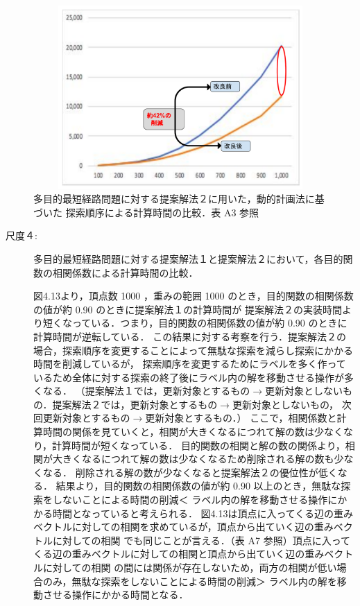 \documentclass[12pt]{optlab-bachelor}
\begin{document}
\begin{figure}[htbp]
  \centering
  \includegraphics[height=7.0cm , width=15.0cm]{fig/fig15.pdf}
  \caption{多目的最短経路問題に対する提案解法２に用いた，動的計画法に基づいた
  探索順序による計算時間の比較．表 A3 参照}
\end{figure}


\begin{description}
  \item[尺度４:]
  多目的最短経路問題に対する提案解法１と提案解法２において，各目的関数の相関係数による計算時間の比較．

  図4.13より，頂点数 1000 ，重みの範囲 1000 のとき，目的関数の相関係数の値が約 0.90 のときに提案解法１の計算時間が
  提案解法２の実装時間より短くなっている．つまり，目的関数の相関係数の値が約 0.90 のときに計算時間が逆転している．
  この結果に対する考察を行う．提案解法２の場合，探索順序を変更することによって無駄な探索を減らし探索にかかる時間を削減しているが，
  探索順序を変更するためにラベルを多く作っているため全体に対する探索の終了後にラベル内の解を移動させる操作が多くなる．
  （提案解法１では，更新対象とするもの$\rightarrow$更新対象としないもの．提案解法２では，更新対象とするもの$\rightarrow$更新対象としないもの，
  次回更新対象とするもの$\rightarrow$更新対象とするもの．）
  ここで，相関係数と計算時間の関係を見ていくと，相関が大きくなるにつれて解の数は少なくなり，計算時間が短くなっている．
  目的関数の相関と解の数の関係より，相関が大きくなるにつれて解の数は少なくなるため削除される解の数も少なくなる．
  削除される解の数が少なくなると提案解法２の優位性が低くなる．
  結果より，目的関数の相関係数の値が約 0.90 以上のとき，無駄な探索をしないことによる時間の削減＜
  ラベル内の解を移動させる操作にかかる時間となっていると考えられる．
  図4.13は頂点に入ってくる辺の重みベクトルに対しての相関を求めているが，頂点から出ていく辺の重みベクトルに対しての相関
  でも同じことが言える．（表 A7 参照）頂点に入ってくる辺の重みベクトルに対しての相関と頂点から出ていく辺の重みベクトルに対しての相関
  の間には関係が存在しないため，両方の相関が低い場合のみ，無駄な探索をしないことによる時間の削減＞
  ラベル内の解を移動させる操作にかかる時間となる．

\end{description}
\end{document}
